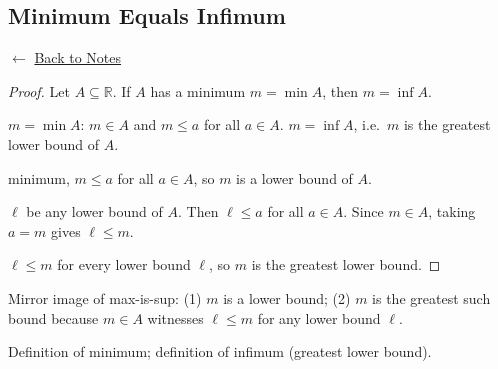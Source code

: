 
\subsection*{Minimum Equals Infimum}
\label{prf:min-is-inf}

\begin{remark*}[Return]
$\leftarrow$ \hyperref[prop:sup-unique]{Back to Notes}
\end{remark*}

\begin{proof}
\Claim Let $A \subseteq \mathbb{R}$.
If $A$ has a minimum $m = \min A$, then $m = \inf A$.

\Given $m = \min A$: $m \in A$ and $m \le a$ for all $a \in A$.
\Goal $m = \inf A$, i.e.\ $m$ is the greatest lower bound of $A$.

\ByDef minimum, $m \le a$ for all $a \in A$, so $m$ is a lower bound of $A$.

\Let $\ell$ be any lower bound of $A$.
Then $\ell \le a$ for all $a \in A$.
Since $m \in A$, taking $a = m$ gives $\ell \le m$.

\Therefore $\ell \le m$ for every lower bound $\ell$, so $m$ is the greatest lower bound. \AsReq
\end{proof}

\begin{remark*}
Mirror image of max-is-sup: (1) $m$ is a lower bound; (2) $m$ is the greatest
such bound because $m \in A$ witnesses $\ell \le m$ for any lower bound $\ell$.
\end{remark*}

\begin{remark*}[Dependencies]
Definition of minimum; definition of infimum (greatest lower bound).
\end{remark*}
